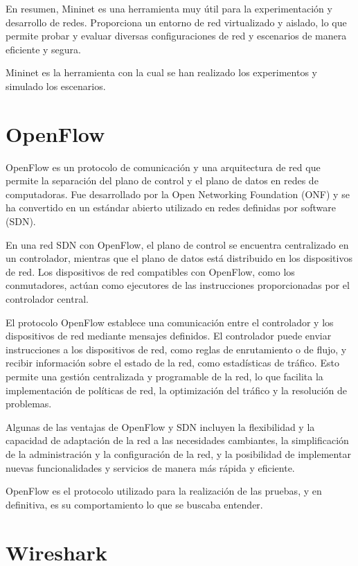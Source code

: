 \documentclass[a4paper, 12pt]{book}
\begin{document}
	
	En resumen, Mininet es una herramienta muy útil para la experimentación y desarrollo de redes. Proporciona un entorno de red virtualizado y aislado, lo que permite probar y evaluar diversas configuraciones de red y escenarios de manera eficiente y segura.
	
	Mininet es la herramienta con la cual se han realizado los experimentos y simulado los escenarios.
	
	\section{OpenFlow}
	\label{sec:openflow}
	
	
	OpenFlow es un protocolo de comunicación y una arquitectura de red que permite la separación del plano de control y el plano de datos en redes de computadoras. Fue desarrollado por la Open Networking Foundation (ONF) y se ha convertido en un estándar abierto utilizado en redes definidas por software (SDN).
	
	En una red SDN con OpenFlow, el plano de control se encuentra centralizado en un controlador, mientras que el plano de datos está distribuido en los dispositivos de red. Los dispositivos de red compatibles con OpenFlow, como los conmutadores, actúan como ejecutores de las instrucciones proporcionadas por el controlador central.
	
	El protocolo OpenFlow establece una comunicación entre el controlador y los dispositivos de red mediante mensajes definidos. El controlador puede enviar instrucciones a los dispositivos de red, como reglas de enrutamiento o de flujo, y recibir información sobre el estado de la red, como estadísticas de tráfico. Esto permite una gestión centralizada y programable de la red, lo que facilita la implementación de políticas de red, la optimización del tráfico y la resolución de problemas.
	
	Algunas de las ventajas de OpenFlow y SDN incluyen la flexibilidad y la capacidad de adaptación de la red a las necesidades cambiantes, la simplificación de la administración y la configuración de la red, y la posibilidad de implementar nuevas funcionalidades y servicios de manera más rápida y eficiente.
	
	OpenFlow es el protocolo utilizado para la realización de las pruebas, y en definitiva, es su comportamiento lo que se buscaba entender.
	
	\section{Wireshark} 
	\label{sec:wireshark}
	
\end{document}
